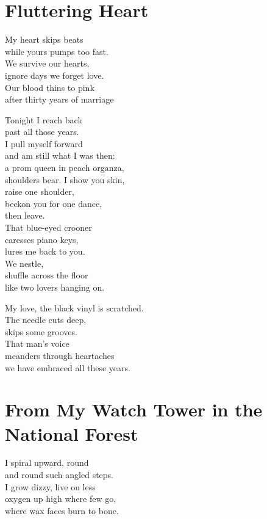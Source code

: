 \documentclass[twoside,10pt]{book}
\begin{document}
\clearpage
\section{Fluttering Heart}

My heart skips beats\\
while yours pumps too fast.\\
We survive our hearts,\\
ignore days we forget love.\\
Our blood thins to pink\\
after thirty years of marriage

Tonight I reach back\\
past all those years.\\
I pull myself forward\\
and am still what I was then:\\
a prom queen in peach organza,\\
shoulders bear. I show you skin,\\
raise one shoulder,\\
beckon you for one dance,\\
then leave.\\
That blue-eyed crooner\\
caresses piano keys,\\
lures me back to you.\\
We nestle,\\
shuffle across the floor\\
like two lovers hanging on.

My love, the black vinyl is scratched.\\
The needle cuts deep,\\
skips some grooves.\\
That man's voice\\
meanders through heartaches\\
we have embraced all these years.


\clearpage
\section{From My Watch Tower in the National Forest}

I spiral upward, round\\
and round such angled steps.\\
I grow dizzy, live on less\\
oxygen up high where few go,\\
where wax faces burn to bone.
\end{document}
